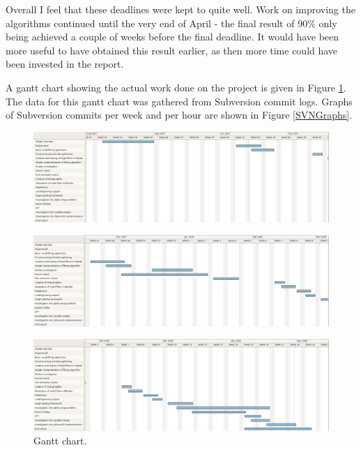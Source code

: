 Overall I feel that these deadlines were kept to quite well.
Work on improving the algorithms continued until the very end of April - the final result of 90\% only being achieved a couple of weeks before the final deadline.
It would have been more useful to have obtained this result earlier, as then more time could have been invested in the report.

A gantt chart showing the actual work done on the project is given in Figure \ref{GanttChart}.
The data for this gantt chart was gathered from Subversion commit logs.
Graphs of Subversion commits per week and per hour are shown in Figure \ref{SVNGraphs}.

\begin{landscape}
	\begin{figure}[p]
		\centering
		\includegraphics[width=21cm]{gantt.png}
	\end{figure}
	\begin{figure}[p]
		\centering
		\includegraphics[width=21cm]{gantt2.png}
	\end{figure}
	\begin{figure}[p]
		\centering
		\includegraphics[width=21cm]{gantt3.png}
		\caption{Gantt chart.}
		\label{GanttChart}
	\end{figure}
\end{landscape}


